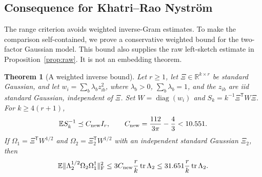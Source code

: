 \documentclass[11pt,a4paper]{article}
\newtheorem{theorem}{Theorem}[section]
\theoremstyle{definition}
\theoremstyle{remark}
\numberwithin{equation}{section}
\newcommand{\E}{\mathbb E}
\newcommand{\R}{\mathbb R}
\newcommand{\T}{{\mathsf T}}
\newcommand{\tr}{\operatorname{tr}}
\newcommand{\diag}{\operatorname{diag}}
\newcommand{\norm}[1]{\lVert#1\rVert}
\newcommand{\F}{\mathrm F}
\begin{document}
\subsection{Consequence for Khatri--Rao Nystr\"om}

The range criterion avoids weighted inverse-Gram estimates. To make the
comparison self-contained, we prove a conservative weighted bound for the
two-factor Gaussian model. This bound also supplies the raw left-sketch
estimate in Proposition~\ref{prop:raw}. It is not an embedding theorem.

\begin{theorem}[A weighted inverse bound]\label{imp:kr}
Let $r\ge1$, let $\Xi\in\R^{k\times r}$ be standard Gaussian, and let
$w_i=\sum_b\lambda_bz_{ib}^2$, where $\lambda_b>0$, $\sum_b\lambda_b=1$,
and the $z_{ib}$ are iid standard Gaussian, independent of $\Xi$. Set
$W=\diag(w_i)$ and $S_k=k^{-1}\Xi^\T W\Xi$. For $k\ge4(r+1)$,
\[
 \E S_k^{-1}\preceq C_{\rm new}I_r,
 \qquad C_{\rm new}=\frac{112}{3\pi}-\frac43<10.551.
\]
If $\Omega_1=\Xi^\T W^{1/2}$ and $\Omega_2=\Xi_2^\T W^{1/2}$ with an
independent standard Gaussian $\Xi_2$, then
\[
 \E\norm{\Lambda_2^{1/2}\Omega_2\Omega_1^\dagger}_\F^2
 \le 3C_{\rm new}\frac rk\tr\Lambda_2
 \le31.651\frac rk\tr\Lambda_2.
\]
\end{theorem}
\end{document}
